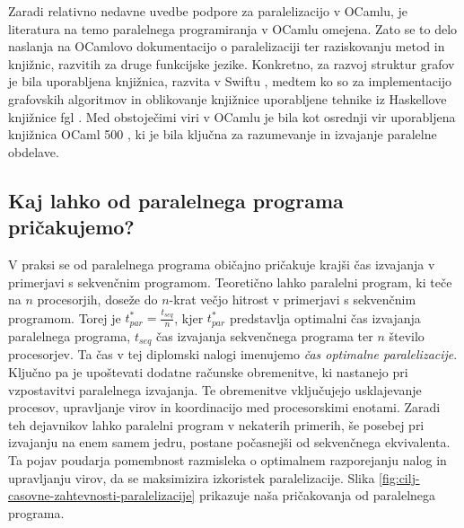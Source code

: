 \documentclass[fin1, tisk]{fmfdelo}
\begin{document}
Zaradi relativno nedavne uvedbe podpore za paralelizacijo v OCamlu, je literatura na temo paralelnega programiranja v OCamlu omejena.
Zato se to delo naslanja na OCamlovo dokumentacijo o paralelizaciji \cite{ocaml_paralelisation_documentation}
ter raziskovanju metod in knjižnic, razvitih za druge funkcijske jezike. Konkretno, za razvoj struktur grafov je bila uporabljena knjižnica,
razvita v Swiftu \cite{functional_swift_graph}, medtem ko so za implementacijo grafovskih algoritmov in oblikovanje knjižnice uporabljene
tehnike iz Haskellove knjižnice fgl \cite{haskell_fgl}. Med obstoječimi viri v OCamlu je bila kot osrednji vir uporabljena knjižnica
OCaml 500 \cite{ocaml_multicore_500}, ki je bila ključna za razumevanje in izvajanje paralelne obdelave.

\subsection{Kaj lahko od paralelnega programa pričakujemo?}

V praksi se od paralelnega programa običajno pričakuje krajši čas izvajanja v primerjavi s sekvenčnim programom.
Teoretično lahko paralelni program, ki teče na $n$ procesorjih, doseže do $n$-krat večjo hitrost v primerjavi s sekvenčnim programom.
Torej je $t_{par}^{*} = \frac{t_{seq}}{n}$, kjer
$t_{par}^{*}$ predstavlja optimalni čas izvajanja paralelnega programa, $t_{seq}$ čas izvajanja sekvenčnega programa ter $n$ število procesorjev.
Ta čas v tej diplomski nalogi imenujemo \textit{čas optimalne paralelizacije}.
Ključno pa je upoštevati dodatne računske obremenitve, ki nastanejo pri vzpostavitvi paralelnega izvajanja.
Te obremenitve vključujejo usklajevanje procesov, upravljanje virov in koordinacijo med procesorskimi enotami.
Zaradi teh dejavnikov lahko paralelni program v nekaterih primerih, še posebej pri izvajanju na enem samem jedru,
postane počasnejši od sekvenčnega ekvivalenta. Ta pojav poudarja pomembnost razmisleka o optimalnem razporejanju
nalog in upravljanju virov, da se maksimizira izkoristek paralelizacije. Slika \ref{fig:cilj-casovne-zahtevnosti-paralelizacije} prikazuje
naša pričakovanja od paralelnega programa.
\end{document}
